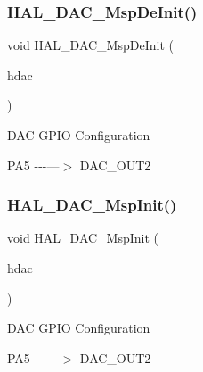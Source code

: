 \subsubsection{\texorpdfstring{HAL\_DAC\_MspDeInit()}{HAL\_DAC\_MspDeInit()}}
{\footnotesize\ttfamily void H\+A\+L\+\_\+\+D\+A\+C\+\_\+\+Msp\+De\+Init (\begin{DoxyParamCaption}\item[{\mbox{\hyperlink{struct_d_a_c___handle_type_def}{D\+A\+C\+\_\+\+Handle\+Type\+Def}} $\ast$}]{hdac }\end{DoxyParamCaption})}

D\+AC G\+P\+IO Configuration

P\+A5 -\/-\/-\/---$>$ D\+A\+C\+\_\+\+O\+U\+T2\mbox{\label{group___d_a_c___exported___functions___group1_gacd409f887681168e93817e8a5485d74b}} 
\subsubsection{\texorpdfstring{HAL\_DAC\_MspInit()}{HAL\_DAC\_MspInit()}}
{\footnotesize\ttfamily void H\+A\+L\+\_\+\+D\+A\+C\+\_\+\+Msp\+Init (\begin{DoxyParamCaption}\item[{\mbox{\hyperlink{struct_d_a_c___handle_type_def}{D\+A\+C\+\_\+\+Handle\+Type\+Def}} $\ast$}]{hdac }\end{DoxyParamCaption})}

D\+AC G\+P\+IO Configuration

P\+A5 -\/-\/-\/---$>$ D\+A\+C\+\_\+\+O\+U\+T2
